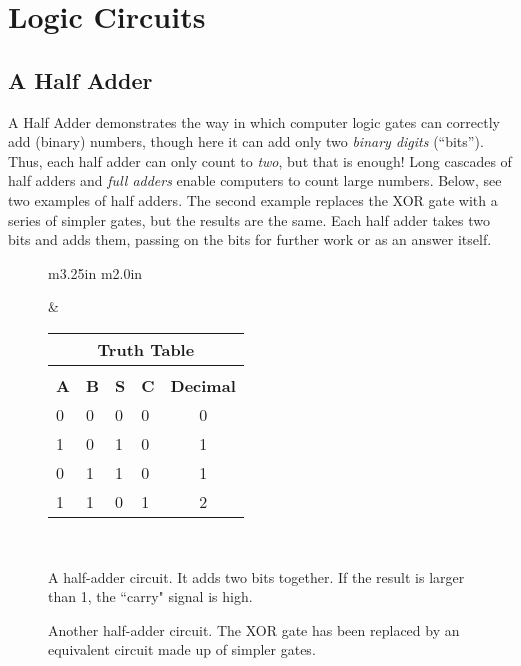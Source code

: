 \section{Logic Circuits}

\subsection*{A Half Adder}

A Half Adder demonstrates the way in which computer logic gates can correctly add (binary) numbers, though here it can add only two \emph{binary digits} (``bits''). Thus, each half adder can only count to \emph{two}, but that is enough!  Long cascades of half adders and \emph{full adders} enable computers to count large numbers. Below, see two examples of half adders. The second example replaces the XOR gate with a series of simpler gates, but the results are the same. Each half adder takes two bits and adds them, passing on the bits for further work or as an answer itself.

\bigskip

\begin{figure}[h!]
\begin{center}
\begin{tabular}{m{3.25in} m{2.0in}}



&

\begin{tabular}{ll | ll | c}
\multicolumn{5}{c}{\textbf{Truth Table}}\\
\hline\\[\negsep]
\textbf{A} & \textbf{B} & \textbf{S} & \textbf{C} & \textbf{Decimal}\\
\hline
0 & 0 & 0 & 0 & 0 \\
1 & 0 & 1  & 0 & 1 \\
0 & 1 & 1  & 0 & 1 \\
1 & 1 & 0  & 1 & 2 \\
\hline
\end{tabular}

\\

\end{tabular}

\caption{A half-adder circuit. It adds two bits together. If the result is larger than 1, the ``carry" signal is high.}
\end{center}
\end{figure}


\begin{figure}[h!]
\begin{center}



\caption{Another half-adder circuit. The XOR gate has been replaced by an equivalent circuit made up of simpler gates.}
\end{center}
\end{figure}


